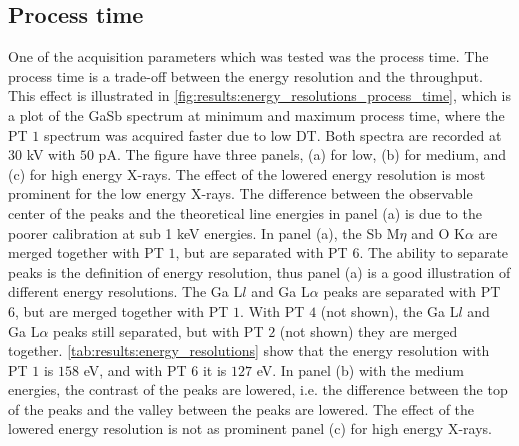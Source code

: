 





\subsection{Process time}
\label{results:process_time}

One of the acquisition parameters which was tested was the process time.
The process time is a trade-off between the energy resolution and the throughput.
This effect is illustrated in \cref{fig:results:energy_resolutions_process_time}, which is a plot of the GaSb spectrum at minimum and maximum process time, where the PT $1$ spectrum was acquired faster due to low DT.
Both spectra are recorded at $30$ kV with $50$ pA.
The figure have three panels, (a) for low, (b) for medium, and (c) for high energy X-rays.
The effect of the lowered energy resolution is most prominent for the low energy X-rays.
The difference between the observable center of the peaks and the theoretical line energies in panel (a) is due to the poorer calibration at sub 1 keV energies.
In panel (a), the Sb M$\eta$ and O K$\alpha$ are merged together with PT $1$, but are separated with PT $6$.
The ability to separate peaks is the definition of energy resolution, thus panel (a) is a good illustration of different energy resolutions.
The Ga L$l$ and Ga L$\alpha$ peaks are separated with PT $6$, but are merged together with PT $1$.
With PT $4$ (not shown), the Ga L$l$ and Ga L$\alpha$ peaks still separated, but with PT $2$ (not shown) they are merged together.
\cref{tab:results:energy_resolutions} show that the energy resolution with PT $1$ is $158$ eV, and with PT $6$ it is $127$ eV.
In panel (b) with the medium energies, the contrast of the peaks are lowered, i.e. the difference between the top of the peaks and the valley between the peaks are lowered.
The effect of the lowered energy resolution is not as prominent panel (c) for high energy X-rays.



